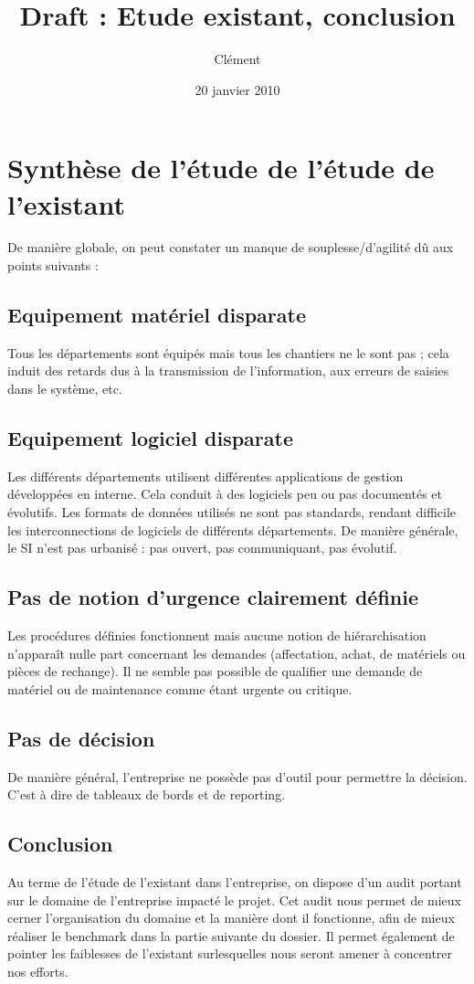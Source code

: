 \documentclass[a4paper]{article}
\title{Draft : Etude existant, conclusion}
\author{Clément}
\date{20 janvier 2010}
\begin{document}
\maketitle


\section{Synthèse de l'étude de l'étude de l'existant}

De manière globale, on peut constater un manque de souplesse/d'agilité dû
aux points suivants :


\subsection{Equipement matériel disparate}
Tous les départements sont équipés mais tous les chantiers ne le sont pas ;
cela induit des retards dus à la transmission de l'information, aux erreurs
de saisies dans le système, etc.  

\subsection{Equipement logiciel disparate}
Les différents départements utilisent différentes applications de gestion
développées en interne. Cela conduit à des logiciels peu ou pas documentés
et évolutifs. Les formats de données utilisés ne sont pas standards,
rendant difficile les interconnections de logiciels de différents
départements. De manière générale, le SI n'est pas urbanisé : pas ouvert,
pas communiquant, pas évolutif.

\subsection{Pas de notion d'urgence clairement définie}
Les procédures définies fonctionnent mais aucune notion de hiérarchisation
n'apparaît nulle part concernant les demandes (affectation, achat, de
matériels ou pièces de rechange).  Il ne semble pas possible de qualifier
une demande de matériel ou de maintenance comme étant urgente ou critique.

\subsection{Pas de décision}

De manière général, l'entreprise ne possède pas d'outil pour permettre la 
décision. C'est à dire de tableaux de bords et de reporting.

\subsection{Conclusion}
Au terme de l'étude de l'existant dans l'entreprise, on dispose d'un audit
portant sur le domaine de l'entreprise impacté le projet. Cet audit nous
permet de mieux cerner l'organisation du domaine et la manière dont il
fonctionne, afin de mieux réaliser le benchmark dans la partie suivante du
dossier. Il permet également de pointer les faiblesses de l'existant
surlesquelles nous seront amener à concentrer nos efforts.
\end{document}
